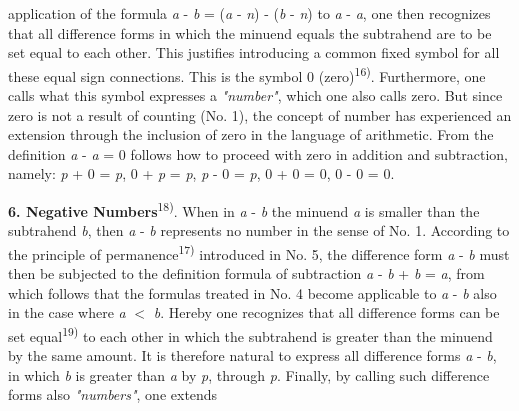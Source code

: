 \thispagestyle{fancy}

\vspace{0.5cm}

application of the formula \textit{a} - \textit{b} = (\textit{a} - \textit{n}) - (\textit{b} - \textit{n}) to \textit{a} - \textit{a}, one then recognizes that all difference forms in which the minuend equals the subtrahend are to be set equal to each other. This justifies introducing a common fixed symbol for all these equal sign connections. This is the symbol 0 (zero)\textsuperscript{16)}. Furthermore, one calls what this symbol expresses a \textit{"number"}, which one also calls zero. But since zero is not a result of counting (No. 1), the concept of number has experienced an extension through the inclusion of zero in the language of arithmetic. From the definition \textit{a} - \textit{a} = 0 follows how to proceed with zero in addition and subtraction, namely: \textit{p} + 0 = \textit{p}, 0 + \textit{p} = \textit{p}, \textit{p} - 0 = \textit{p}, 0 + 0 = 0, 0 - 0 = 0.

\textbf{6. Negative Numbers}\textsuperscript{18)}. When in \textit{a} - \textit{b} the minuend \textit{a} is smaller than the subtrahend \textit{b}, then \textit{a} - \textit{b} represents no number in the sense of No. 1. According to the principle of permanence\textsuperscript{17)} introduced in No. 5, the difference form \textit{a} - \textit{b} must then be subjected to the definition formula of subtraction \textit{a} - \textit{b} + \textit{b} = \textit{a}, from which follows that the formulas treated in No. 4 become applicable to \textit{a} - \textit{b} also in the case where \textit{a} $<$ \textit{b}. Hereby one recognizes that all difference forms can be set equal\textsuperscript{19)} to each other in which the subtrahend is greater than the minuend by the same amount. It is therefore natural to express all difference forms \textit{a} - \textit{b}, in which \textit{b} is greater than \textit{a} by \textit{p}, through \textit{p}. Finally, by calling such difference forms also \textit{"numbers"}, one extends

